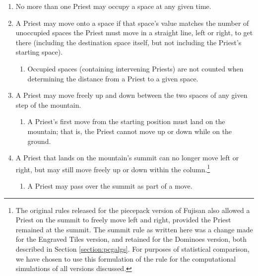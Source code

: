 \documentclass[10pt,journal,compsoc]{IEEEtran}
\begin{document}
\begin{enumerate}
\item No more than one Priest may occupy a space at any given time.

\item A Priest may move onto a space if that space's value matches the number of unoccupied spaces the Priest must move in a straight line, left or right, to get there (including the destination space itself, but not including the Priest's starting space). %
\begin{enumerate}
\item Occupied spaces (containing intervening Priests) are not counted when determining the distance from a Priest to a given space. %
\end{enumerate}
\item A Priest may move freely up and down between the two spaces of any given step of the mountain. %
\begin{enumerate}
\item A Priest's first move from the starting position must land on the mountain; that is, the Priest cannot move up or down while on the ground.
\end{enumerate}

\item A Priest that lands on the mountain's summit can no longer move left or right, but may still move freely up or down within the column.\footnote{The original rules released for the piecepack version of Fujisan also allowed a Priest on the summit to freely move left and right, provided the Priest remained at the summit. The summit rule as written here was a change made for the Engraved Tiles version, and retained for the Dominoes version, both described in Section \ref{section:pcgalgs}. For purposes of statistical comparison, we have chosen to use this formulation of the rule for the computational simulations of all versions discussed.}
\begin{enumerate}
\item A Priest may pass over the summit as part of a move.
\end{enumerate}


\end{enumerate}
\end{document}
